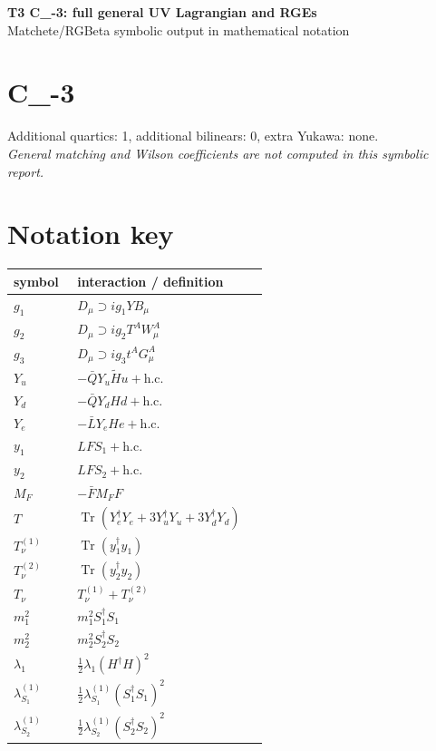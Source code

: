 \documentclass[10pt,a4paper]{article}
\begin{document}
\begin{center}
{\Large\bfseries T3 C\_-3: full general UV Lagrangian and RGEs}\\[4pt]
Matchete/RGBeta symbolic output in mathematical notation
\end{center}
\bigskip
\section*{C\_-3}
Additional quartics: 1, additional bilinears: 0, extra Yukawa: none.\\
\emph{General matching and Wilson coefficients are not computed in this symbolic report.}
\section*{Notation key}
\begin{longtable}{@{}p{0.23\linewidth}p{0.69\linewidth}@{}}
\toprule
symbol & interaction / definition \\
\midrule
$g_1$ & $D_\mu\supset i g_1YB_\mu$ \\
$g_2$ & $D_\mu\supset i g_2T^AW_\mu^A$ \\
$g_3$ & $D_\mu\supset i g_3t^AG_\mu^A$ \\
$Y_u$ & $-\bar QY_u\widetilde Hu+\mathrm{h.c.}$ \\
$Y_d$ & $-\bar QY_dHd+\mathrm{h.c.}$ \\
$Y_e$ & $-\bar LY_eHe+\mathrm{h.c.}$ \\
$y_1$ & $LFS_1+\mathrm{h.c.}$ \\
$y_2$ & $LFS_2+\mathrm{h.c.}$ \\
$M_F$ & $-\bar FM_FF$ \\
$T$ & $\operatorname{Tr}(Y_e^\dagger Y_e+3Y_u^\dagger Y_u+3Y_d^\dagger Y_d)$ \\
$T_\nu^{(1)}$ & $\operatorname{Tr}(y_1^\dagger y_1)$ \\
$T_\nu^{(2)}$ & $\operatorname{Tr}(y_2^\dagger y_2)$ \\
$T_\nu$ & $T_\nu^{(1)}+T_\nu^{(2)}$ \\
$m_1^2$ & $m_1^2S_1^\dagger S_1$ \\
$m_2^2$ & $m_2^2S_2^\dagger S_2$ \\
$\lambda_1$ & $\frac12\lambda_1(H^\dagger H)^2$ \\
$\lambda_{S_1}^{(1)}$ & $\frac12\lambda_{S_1}^{(1)}(S_1^\dagger S_1)^2$ \\
$\lambda_{S_2}^{(1)}$ & $\frac12\lambda_{S_2}^{(1)}(S_2^\dagger S_2)^2$ \\

\end{longtable}
\end{document}
